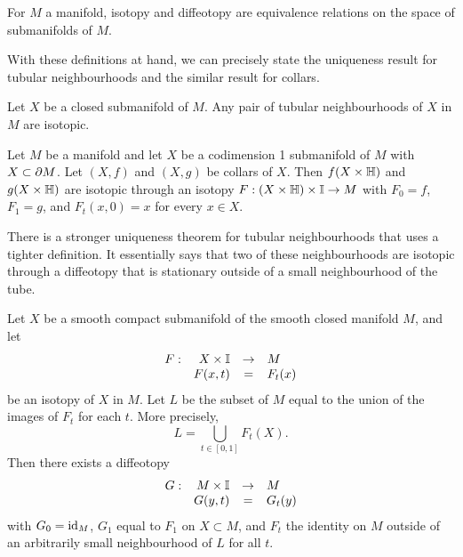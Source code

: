 \begin{prop}
	For $M$ a manifold, isotopy and diffeotopy are equivalence relations on the space of submanifolds of $M$.
\end{prop}

With these definitions at hand, we can precisely state the uniqueness result for tubular neighbourhoods and the similar result for collars.

\begin{theorem}
	\label{prop:uniquenesstubularneighbourhood}
	Let $X$ be a closed submanifold of $M$.
	Any pair of tubular neighbourhoods of $X$ in $M$ are isotopic.
\end{theorem}

\begin{theorem}
	Let $M$ be a manifold and let $X$ be a codimension 1 submanifold of $M$ with $X\subset \partial M$.
	Let $(X,f)$ and $(X,g)$ be collars of $X$.
	Then $f(X\times\mathbb{H})$ and $g(X\times\mathbb{H})$ are isotopic through an isotopy $F:(X\times\mathbb{H})\times\mathbb{I}\to M$ with $F_0=f$, $F_1=g$, and $F_t(x,0)=x$ for every $x\in X$.	
\end{theorem}

There is a stronger uniqueness theorem for tubular neighbourhoods that uses a tighter definition.
It essentially says that two of these neighbourhoods are isotopic through a diffeotopy that is stationary outside of a small neighbourhood of the tube.

\begin{theorem}
	\label{thm:isotopyextension}
	Let $X$ be a smooth compact submanifold of the smooth closed manifold $M$, and let
	\[
		\begin{array}{crcl}
			F: & X\times\mathbb{I} & \to & M \\
			   & F(x,t) & = & F_t(x)
		\end{array}
	\]
	be an isotopy of $X$ in $M$.
	Let $L$ be the subset of $M$ equal to the union of the images of $F_t$ for each $t$.
	More precisely,
	\[
		L = \bigcup_{t\in[0,1]} F_t(X).
	\]
	Then there exists a diffeotopy 
	\[
		\begin{array}{crcl}
			G: & M\times\mathbb{I} & \to & M \\
			   & G(y,t) & = & G_t(y)				
		\end{array}
	\]
	with $G_0=\textrm{id}_{M}$, $G_1$ equal to $F_1$ on $X\subset M$, and $F_t$ the identity on $M$ outside of an arbitrarily small neighbourhood of $L$ for all $t$.
\end{theorem}

